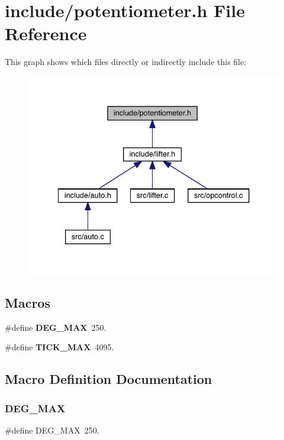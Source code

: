 \section{include/potentiometer.h File Reference}
\label{potentiometer_8h}
This graph shows which files directly or indirectly include this file\+:\nopagebreak
\begin{figure}[H]
\begin{center}
\leavevmode
\includegraphics[width=334pt]{potentiometer_8h__dep__incl}
\end{center}
\end{figure}
\subsection*{Macros}
\begin{DoxyCompactItemize}
\item 
\#define \textbf{ D\+E\+G\+\_\+\+M\+AX}~250.
\item 
\#define \textbf{ T\+I\+C\+K\+\_\+\+M\+AX}~4095.
\end{DoxyCompactItemize}


\subsection{Macro Definition Documentation}
\mbox{\label{potentiometer_8h_ab77b81696cf83be632fca5f56b4c3595}} 
\subsubsection{D\+E\+G\+\_\+\+M\+AX}
{\footnotesize\ttfamily \#define D\+E\+G\+\_\+\+M\+AX~250.}



